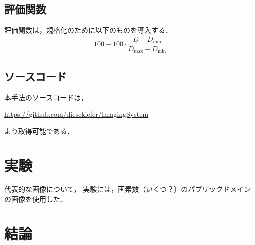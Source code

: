 \documentclass[dvipdfmx]{jsarticle}
\begin{document}
\subsection{評価関数}
評価関数は，規格化のために以下のものを導入する．
\begin{align}
100-100\cdot\dfrac{D-D_{\mathrm{min}}}{D_{\mathrm{max}}-D_{\mathrm{min}}}
\end{align}



\subsection{ソースコード}

本手法のソースコードは，

\noindent\url{https://github.com/diesekiefer/ImagingSystem}

\noindent より取得可能である．


\section{実験}
代表的な画像について，
実験には，画素数（いくつ？）のパブリックドメインの画像を使用した．


\section{結論}
\end{document}
